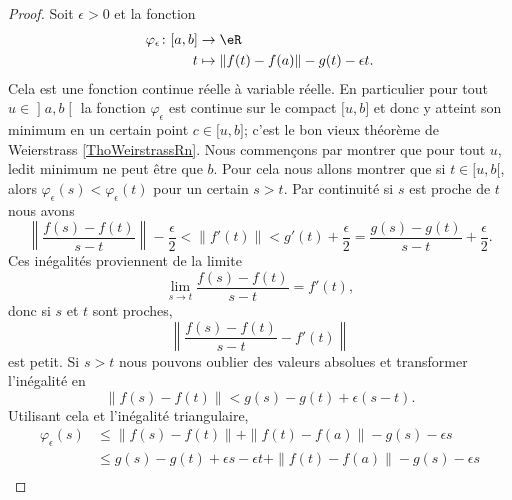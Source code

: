 \begin{proof}
    Soit \( \epsilon>0\) et la fonction
    \begin{equation}
        \begin{aligned}
            \varphi_{\epsilon}\colon \mathopen[ a , b \mathclose]&\to \eR \\
            t&\mapsto \| f(t)-f(a) \|-g(t)-\epsilon t. 
        \end{aligned}
    \end{equation}
    Cela est une fonction continue réelle à variable réelle. En particulier pour tout \( u\in\mathopen] a , b \mathclose[\) la fonction \( \varphi_{\epsilon}\) est continue sur le compact \( \mathopen[ u , b \mathclose]\) et donc y atteint son minimum en un certain point \( c\in\mathopen[ u , b \mathclose]\); c'est le bon vieux théorème de Weierstrass \ref{ThoWeirstrassRn}. Nous commençons par montrer que pour tout \( u\), ledit minimum ne peut être que \( b\). Pour cela nous allons montrer que si \( t\in\mathopen[ u , b [\), alors \( \varphi_{\epsilon}(s)<\varphi_{\epsilon}(t)\) pour un certain \( s>t\). Par continuité si \( s\) est proche de \( t\) nous avons
        \begin{equation}
            \left\|  \frac{ f(s)-f(t) }{ s-t }  \right\|-\frac{ \epsilon }{2}<\| f'(t) \|<g'(t)+\frac{ \epsilon }{2}=\frac{ g(s)-g(t) }{ s-t }+\frac{ \epsilon }{2}.
        \end{equation}
        Ces inégalités proviennent de la limite
        \begin{equation}
            \lim_{s\to t} \frac{ f(s)-f(t) }{ s-t }=f'(t),
        \end{equation}
        donc si \( s\) et \( t\) sont proches,
        \begin{equation}
            \left\| \frac{ f(s)-f(t) }{ s-t }-f'(t) \right\|
        \end{equation}
        est petit. Si \( s>t\) nous pouvons oublier des valeurs absolues et transformer l'inégalité en
        \begin{equation}
            \| f(s)-f(t) \|<g(s)-g(t)+\epsilon(s-t).
        \end{equation}
        Utilisant cela et l'inégalité triangulaire,
        \begin{subequations}
            \begin{align}
                \varphi_{\epsilon}(s)&\leq\| f(s)-f(t) \|+\| f(t)-f(a) \|-g(s)-\epsilon s\\
                &\leq g(s)-g(t)+\epsilon s-\epsilon t+\| f(t)-f(a) \|-g(s)-\epsilon s\\

\end{align}
\end{subequations}
\end{proof}
